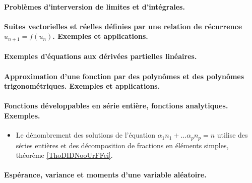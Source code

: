 \paragraph{Problèmes d'interversion de limites et d'intégrales.}
\paragraph{Suites vectorielles et réelles définies par une relation de récurrence \( u_{n+1}=f(u_n)\). Exemples et applications.}
\paragraph{Exemples d'équations aux dérivées partielles linéaires.}
\paragraph{Approximation d’une fonction par des polynômes et des polynômes trigonométriques. Exemples et applications.}
\paragraph{Fonctions développables en série entière, fonctions analytiques. Exemples.}
\begin{itemize}
    \item Le dénombrement des solutions de l'équation \( \alpha_1 n_1+\ldots \alpha_pn_p=n\) utilise des séries entières et des décomposition de fractions en éléments simples, théorème \ref{ThoDIDNooUrFFei}.
\end{itemize}
\paragraph{Espérance, variance et moments d'une variable aléatoire.}
